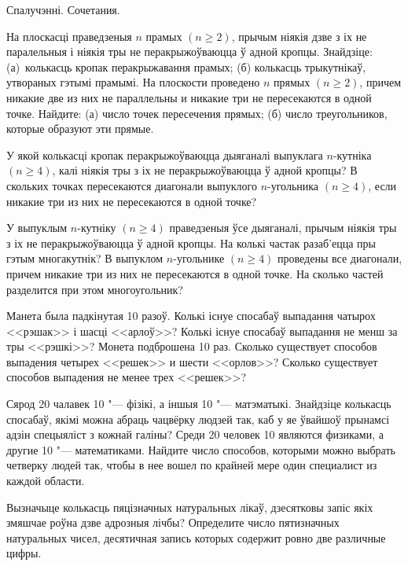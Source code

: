 \biLangHeader
{Спалучэнні.}
{Сочетания.}

\begin{problemList}

\problemItemSimple
{На плоскасці праведзеныя $n$ прамых $(n \ge 2)$, прычым ніякія дзве з іх не паралельныя
і ніякія тры не перакрыжоўваюцца ў адной кропцы. Знайдзіце: (а)~колькасць кропак перакрыжавання прамых;
(б) колькасць трыкутнікаў, утвораных гэтымі прамымі.}
{На плоскости проведено $n$ прямых $(n \ge 2)$, причем никакие две из
них не параллельны и никакие три не пересекаются в одной точке.
Найдите: (а) число точек пересечения прямых; (б) число треугольников,
которые образуют эти прямые.}

\bigskip

\problemItemSimple
{У якой колькасці кропак перакрыжоўваюцца дыяганалі выпуклага $n$-кутніка
$(n \ge 4)$, калі ніякія тры з іх не перакрыжоўваюцца ў адной кропцы?}
{В скольких точках пересекаются диагонали выпуклого $n$-угольника
$(n \ge 4)$, если никакие три из них не пересекаются в одной точке?}

\bigskip

\problemItemSimple
{У выпуклым $n$-кутніку $(n \ge 4)$ праведзеныя ўсе дыяганалі, прычым
ніякія тры з іх не перакрыжоўваюцца ў адной кропцы. На колькі частак разаб'ецца
пры гэтым многакутнік?}
{В выпуклом $n$-угольнике $(n \ge 4)$ проведены все диагонали, причем
никакие три из них не пересекаются в одной точке. На сколько частей
разделится при этом многоугольник?}

\bigskip

\problemItemSimple
{Манета была падкінутая 10 разоў. Колькі існуе спосабаў выпадання чатырох
<<рэшак>> і шасці <<арлоў>>?
Колькі існуе спосабаў выпадання не менш за тры <<рэшкі>>?}
{Монета подброшена 10 раз. Сколько существует способов выпадения
четырех <<решек>> и шести <<орлов>>? Сколько существует способов выпадения
не менее трех <<решек>>?}

\bigskip

\problemItemSimple
{Сярод 20 чалавек 10 "--- фізікі, а іншыя 10 "--- матэматыкі. Знайдзіце колькасць спосабаў,
якімі можна абраць чацвёрку людзей так, каб у яе ўвайшоў прынамсі адзін спецыяліст з кожнай галіны?}
{Среди 20 человек 10 являются физиками, а другие 10 "--- математиками.
Найдите число способов, которыми можно выбрать четверку людей так,
чтобы в нее вошел по крайней мере один специалист из каждой области.}

\bigskip

\problemItemSimple
{Вызначыце колькасць пяцізначных натуральных лікаў, дзесятковы запіс якіх змяшчае роўна дзве адрозныя лічбы?}
{Определите число пятизначных натуральных чисел, десятичная запись
которых содержит ровно две различные цифры.}


\end{problemList}
